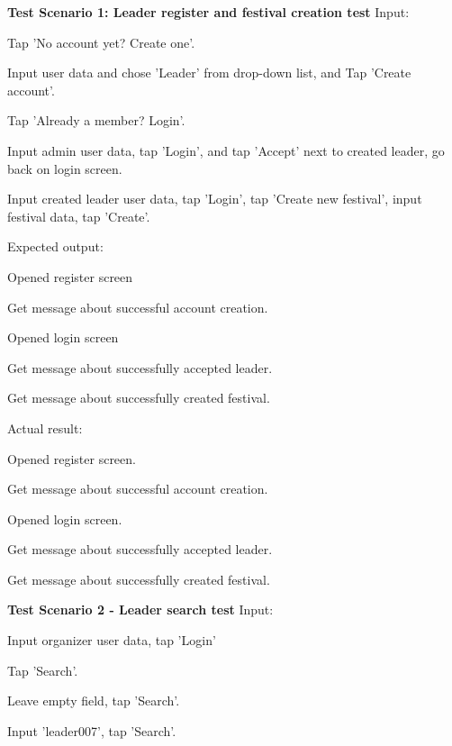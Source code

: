 			 \textbf{Test Scenario 1: Leader register and festival creation test}
			 Input:
			 \begin{packed_enum}
			 	\item Tap 'No account yet? Create one'.
			 	\item Input user data and chose 'Leader' from drop-down list, and Tap 'Create account'.
			 	\item Tap 'Already a member? Login'.
			 	\item Input admin user data, tap 'Login', and tap 'Accept' next to created leader, go back on login screen.
			 	\item Input created leader user data, tap 'Login', tap 'Create new festival', input festival data, tap 'Create'.
			 \end{packed_enum}
		 
		 	Expected output:
		 	\begin{packed_enum}
		 		\item Opened register screen
		 		\item Get message about successful account creation.
		 		\item Opened login screen
		 		\item Get message about successfully accepted leader.
		 		\item Get message about successfully created festival.
		 	\end{packed_enum}
	 	
	 		Actual result:
	 		\begin{packed_enum}
	 			\item Opened register screen.
	 			\item Get message about successful account creation.
	 			\item Opened login screen.
	 			\item Get message about successfully accepted leader.
	 			\item Get message about successfully created festival.
	 		\end{packed_enum}
	 		
	 		\textbf{Test Scenario 2 - Leader search test}
	 		Input:
	 		\begin{packed_enum}
	 			\item Input organizer user data, tap 'Login'
	 			\item Tap 'Search'.
	 			\item Leave empty field, tap 'Search'.
	 			\item Input 'leader007', tap 'Search'.
	 		\end{packed_enum}
	 		
